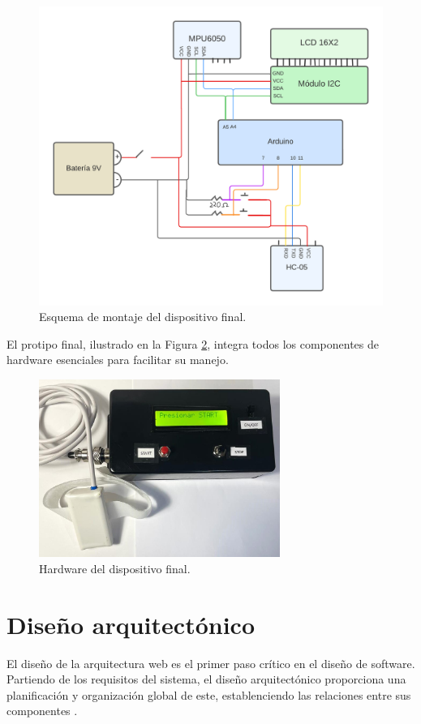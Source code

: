 \begin{figure}[h]
    \centering
    \includegraphics[width=1\textwidth]{img/E1_Planos/EsquemaArduino.png}
    \caption{Esquema de montaje del dispositivo final.}
    \label{fig:arqFinal}
\end{figure}

El protipo final, ilustrado en la Figura \ref{fig:hardwareFinal}, integra todos los componentes de hardware esenciales para facilitar su manejo.

\begin{figure}[h]
    \centering
    \includegraphics[width=0.7\textwidth]{img/E1_Planos/montajeFinal.jpg}
    \caption{Hardware del dispositivo final.}
    \label{fig:hardwareFinal}
\end{figure}


\section{Diseño arquitectónico}
El diseño de la arquitectura web es el primer paso crítico en el diseño de software. Partiendo de los requisitos del sistema, el diseño arquitectónico proporciona una planificación y organización global de este, establenciendo las relaciones entre sus componentes \cite{castro2015arquitectura}.

